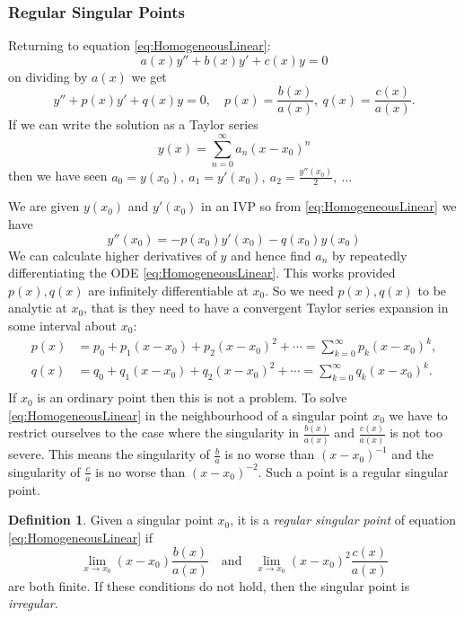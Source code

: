 \documentclass{article}
\theoremstyle{plain}
\theoremstyle{definition}
\newtheorem{definition}[thm]{Definition}
\numberwithin{equation}{section}
\begin{document}
\subsubsection{Regular Singular Points}

Returning to equation \eqref{eq:HomogeneousLinear}:
\[
a(x)y'' + b(x)y' + c(x)y = 0
\]
on dividing by $a(x)$ we get
\begin{equation}\label{eq:dividedHomogeneous}
    y'' + p(x)y' + q(x)y = 0, \quad p(x) = \frac{b(x)}{a(x)}, \ q(x)=\frac{c(x)}{a(x)}.
\end{equation}
If we can write the solution as a Taylor series
\[
    y(x) = \sum_{n=0}^{\infty} a_n(x-x_0)^n
\]
then we have seen $a_0=y(x_0),\ a_1=y'(x_0),\ a_2=\frac{y''(x_0)}{2},\ \ldots$

We are given $y(x_0)$ and $y'(x_0)$ in an IVP so from \eqref{eq:HomogeneousLinear} we have
\[
    y''(x_0) = -p(x_0)y'(x_0) - q(x_0)y(x_0)
\]
We can calculate higher derivatives of $y$ and hence find $a_n$ by repeatedly differentiating the ODE \eqref{eq:HomogeneousLinear}. This works provided $p(x), q(x)$ are infinitely differentiable at $x_0$. So we need $p(x), q(x)$ to be analytic at $x_0$, that is they need to have a convergent Taylor series expansion in some interval about $x_0$:
\begin{align*}
    p(x) &= p_0 + p_1(x-x_0) + p_2(x-x_0)^2 + \cdots = \sum_{k=0}^{\infty} p_k(x-x_0)^k, \\
    q(x) &= q_0 + q_1(x-x_0) + q_2(x-x_0)^2 + \cdots = 
    \sum_{k=0}^{\infty} q_k(x-x_0)^k. \\
\end{align*}
If $x_0$ is an ordinary point then this is not a problem. To solve \eqref{eq:HomogeneousLinear} in the neighbourhood of a singular point $x_0$ we have to restrict ourselves to the case where the singularity in $\frac{b(x)}{a(x)}$ and $\frac{c(x)}{a(x)}$ is not too severe. This means the singularity of $\frac{b}{a}$ is no worse than $(x-x_0)^{-1}$ and the singularity of $\frac{c}{a}$ is no worse than $(x-x_0)^{-2}$. Such a point is a regular singular point.

\begin{definition}
    Given a singular point $x_0$, it is a \textit{regular singular point} of equation \eqref{eq:HomogeneousLinear} if
    \[
    \lim_{x\to x_0}(x-x_0)\frac{b(x)}{a(x)} \quad \text{and} \quad \lim_{x\to x_0}(x-x_0)^2\frac{c(x)}{a(x)}
    \]
    are both finite. If these conditions do not hold, then the singular point is \textit{irregular}.
\end{definition}
\end{document}
